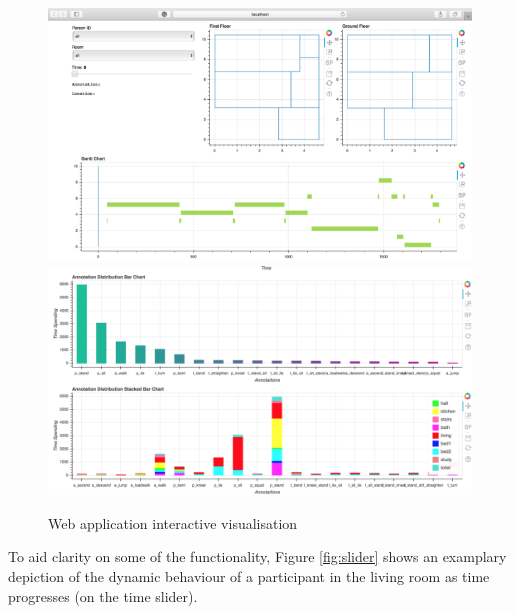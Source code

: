 \documentclass[fleqn,10pt]{SelfArx} %
\begin{document}
\begin{figure}[!h] \centering
	\includegraphics[scale=0.8]{webapp1} 
	\includegraphics[scale=0.425]{webapp2}
	\caption{Web application interactive visualisation}
	\label{fig:webapp}
\end{figure}

To aid clarity on some of the functionality, Figure \ref{fig:slider} shows an examplary depiction of the dynamic behaviour of a participant in the living room as time progresses (on the time slider). \\
\end{document}
